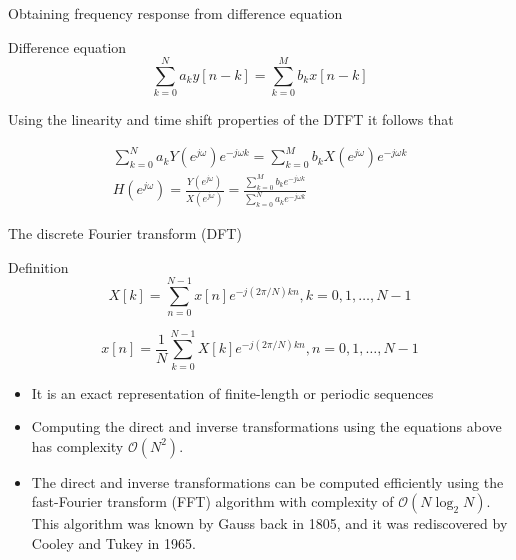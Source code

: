 %
\begin{frame}{Obtaining frequency response from difference equation}
	
	\begin{block}{Difference equation}
		\begin{equation*}
		\sum_{k=0}^N a_k y[n-k] = \sum_{k=0}^Mb_k x[n-k]
		\end{equation*}
	\end{block}
	
	Using the linearity and time shift properties of the DTFT it follows that
	
	\begin{align*}
	\sum_{k=0}^N a_kY(e^{j\omega})e^{-j\omega k} = \sum_{k=0}^M b_kX(e^{j\omega})e^{-j\omega k} \\
	H(e^{j\omega}) = \frac{Y(e^{j\omega})}{X(e^{j\omega})} = \frac{\sum_{k=0}^M b_ke^{-j\omega k}}{\sum_{k=0}^N a_ke^{-j\omega k}}
	\end{align*}
\end{frame}



\begin{frame}{The discrete Fourier transform (DFT)}
	
	\begin{block}{Definition}
		\begin{equation} \tag{Direct transform}
		X[k] = \sum_{n=0}^{N-1} x[n]e^{-j(2\pi/N)kn}, k = 0, 1, \ldots, N-1
		\end{equation}
		
		\begin{equation} \tag{Inverse transform}
		x[n] = \frac{1}{N}\sum_{k=0}^{N-1} X[k]e^{-j(2\pi/N)kn}, n = 0, 1, \ldots, N-1
		\end{equation}
	\end{block}
	
	\begin{itemize}
		\item It is an exact representation of finite-length or periodic sequences
		\item Computing the direct and inverse transformations using the equations above has complexity $\mathcal{O}(N^2)$.
		\item The direct and inverse transformations can be computed efficiently using the fast-Fourier transform (FFT) algorithm with complexity of $\mathcal{O}(N\log_2 N)$. This algorithm was known by Gauss back in 1805, and it was  rediscovered by Cooley and Tukey in 1965.
	\end{itemize}
	
\end{frame}


